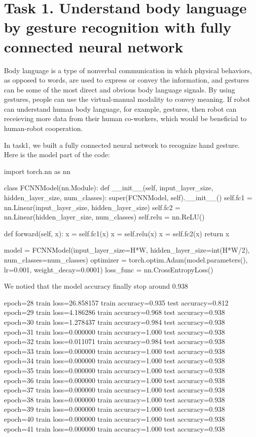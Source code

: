 \documentclass{article}
\begin{document}
\clearpage

\section*{Task 1. Understand body language by gesture recognition with fully
connected neural network }

Body language is a type of nonverbal communication in which physical behaviors, as opposed to words, are used to express or convey the information,
and gestures can be some of the most direct and obvious body language signals.
By using gestures, people can use the virtual-manual modality to convey meaning.
If robot can understand human body language, for example, gestures, then robot can receieving more 
data from their human co-workers, which would be beneficial to human-robot cooperation.\par

In task1, we built a fully connected neural network to recognize hand gesture. Here is the model part of the code: \par

\begin{python}
import torch.nn as nn

class FCNNModel(nn.Module):
    def __init__(self, input_layer_size, hidden_layer_size, num_classes):
        super(FCNNModel, self).__init__()
        self.fc1 = nn.Linear(input_layer_size, hidden_layer_size)
        self.fc2 = nn.Linear(hidden_layer_size, num_classes)
        self.relu = nn.ReLU()

    def forward(self, x):
        x = self.fc1(x)
        x = self.relu(x)
        x = self.fc2(x)
        return x
\end{python}
\begin{python}
model = FCNNModel(input_layer_size=H*W, hidden_layer_size=int(H*W/2), num_classes=num_classes)
optimizer = torch.optim.Adam(model.parameters(), lr=0.001, weight_decay=0.0001)
loss_func = nn.CrossEntropyLoss()
\end{python}

We notied that the model accuracy finally stop around 0.938

\begin{python}
epoch=28	train loss=26.858157	train accuracy=0.935	test accuracy=0.812
epoch=29	train loss=4.186286	train accuracy=0.968	test accuracy=0.938
epoch=30	train loss=1.278437	train accuracy=0.984	test accuracy=0.938
epoch=31	train loss=0.000000	train accuracy=1.000	test accuracy=0.938
epoch=32	train loss=0.011071	train accuracy=0.984	test accuracy=0.938
epoch=33	train loss=0.000000	train accuracy=1.000	test accuracy=0.938
epoch=34	train loss=0.000000	train accuracy=1.000	test accuracy=0.938
epoch=35	train loss=0.000000	train accuracy=1.000	test accuracy=0.938
epoch=36	train loss=0.000000	train accuracy=1.000	test accuracy=0.938
epoch=37	train loss=0.000000	train accuracy=1.000	test accuracy=0.938
epoch=38	train loss=0.000000	train accuracy=1.000	test accuracy=0.938
epoch=39	train loss=0.000000	train accuracy=1.000	test accuracy=0.938
epoch=40	train loss=0.000000	train accuracy=1.000	test accuracy=0.938
epoch=41	train loss=0.000000	train accuracy=1.000	test accuracy=0.938
\end{python}
\end{document}
